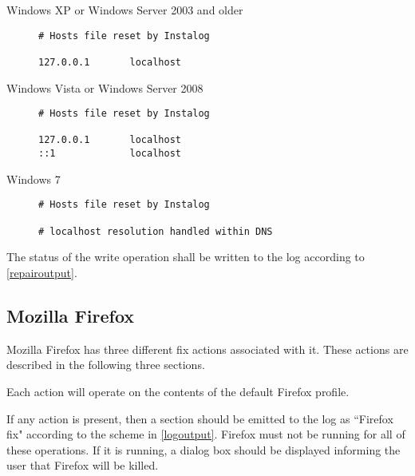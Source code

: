 \begin{description}
\item[Windows XP or Windows Server 2003 and older] \hfill 
\begin{verbatim}
# Hosts file reset by Instalog

127.0.0.1       localhost
\end{verbatim}
\item[Windows Vista or Windows Server 2008] \hfill 
\begin{verbatim}
# Hosts file reset by Instalog

127.0.0.1       localhost
::1             localhost
\end{verbatim}
\item[Windows 7] \hfill 
\begin{verbatim}
# Hosts file reset by Instalog

# localhost resolution handled within DNS
\end{verbatim}
\end{description}

The status of the write operation shall be written to the log according to
\ref{repairoutput}.  

\subsection{Mozilla Firefox}
Mozilla Firefox has three different fix actions associated with it.  These
actions are described in the following three sections.

Each action will operate on the contents of the default Firefox profile.

If any action is present, then a section should be emitted to the log as
``Firefox fix" according to the scheme in \ref{logoutput}.  Firefox must not
be running for all of these operations.  If it is running, a dialog box should
be displayed informing the user that Firefox will be killed.  

